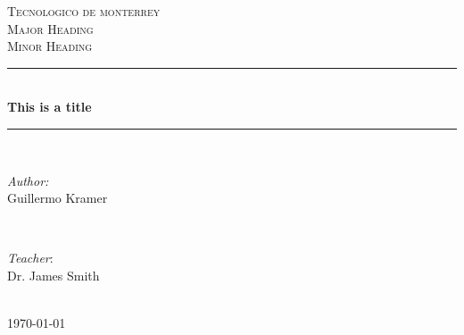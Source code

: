 \documentclass[a4paper, 12pt]{article} %
\begin{document}

\begin{titlepage}

\newcommand{\HRule}{\rule{\linewidth}{0.5mm}} %

\center %

\textsc{\LARGE Tecnologico de monterrey}\\[1.5cm] %
\textsc{\Large Major Heading}\\[0.5cm] %
\textsc{\large Minor Heading}\\[0.5cm] %

\HRule \\[0.4cm]
{ \huge \bfseries This is a title}\\[0.4cm] %
\HRule \\[1.5cm]

\begin{minipage}{0.4\textwidth}
\begin{flushleft} \large
\emph{Author:}\\
Guillermo Kramer %
\end{flushleft}
\end{minipage}
~
\begin{minipage}{0.4\textwidth}
\begin{flushright} \large
\textit{Teacher}: \\
Dr. James Smith %
\end{flushright}
\end{minipage}\\[4cm]

{\large \today}\\[3cm] %


\vfill %

\end{titlepage}

\end{document}
